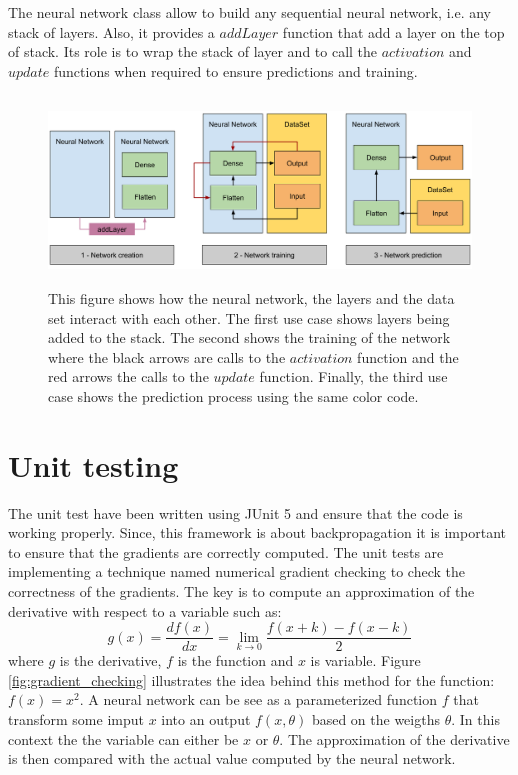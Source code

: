 \documentclass[11pt]{report}
\begin{document}
The neural network class allow to build any sequential neural network, i.e. any stack of layers. Also, it provides a $addLayer$ function that add a layer on the top of stack. Its role is to wrap the stack of layer and to call the $activation$ and $update$ functions when required to ensure predictions and training.

\begin{figure}[h]
\centering
\includegraphics[width=15cm, height=5cm]{neural_network}
\caption{This figure shows how the neural network, the layers and the data set interact with each other. The first use case shows layers being added to the stack. The second shows the training of the network where the black arrows are calls to the $activation$ function and the red arrows the calls to the $update$ function. Finally, the third use case shows the prediction process using the same color code.}
\end{figure}

\section{Unit testing}

The unit test have been written using JUnit 5 and ensure that the code is working properly. Since, this framework is about backpropagation it is important to ensure that the gradients are correctly computed. The unit tests are implementing a technique named numerical gradient checking to check the correctness of the gradients. The key is to compute an approximation of the derivative with respect to a variable such as:
\begin{equation}
g(x) = \frac{df(x)}{dx} = \lim_{k\to0} \frac{f(x + k) - f(x - k)}{2}
\end{equation}
where $g$ is the derivative, $f$ is the function and $x$ is variable.
Figure \ref{fig:gradient_checking} illustrates the idea behind this method for the function: $f(x) = x^{2}$. A neural network can be see as a parameterized function $f$ that transform some imput $x$ into an output $f(x, \theta)$ based on the weigths $\theta$. In this context the the variable can either be $x$ or $\theta$. The approximation of the derivative is then compared with the actual value computed by the neural network.
\end{document}
